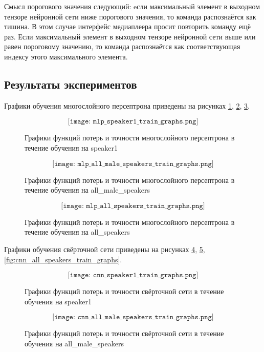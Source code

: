 Смысл порогового значения следующий: eсли максимальный элемент в выходном тензоре нейронной сети ниже порогового значения, то команда распознаётся как тишина. В этом случае интерфейс медиаплеера просит повторить команду ещё раз. Если максимальный элемент в выходном тензоре нейронной сети выше или равен пороговому значению, то команда распознаётся как соответствующая индексу этого максимального элемента. 

\newpage
\subsection{Результаты экспериментов}
Графики обучения многослойного персептрона приведены на рисунках \ref{fig:mlp_speaker1_train_graphs}, \ref{fig:mlp_all_male_speakers_train_graphs}, \ref{fig:mlp_all_speakers_train_graphs}.

\begin{figure}[H]
	\[\texttt{[image: mlp\_speaker1\_train\_graphs.png]}\]
	\caption{Графики функций потерь и точности многослойного персептрона в течение обучения на speaker1}
	\label{fig:mlp_speaker1_train_graphs}
\end{figure}

\begin{figure}[H]
	\[\texttt{[image: mlp\_all\_male\_speakers\_train\_graphs.png]}\]
	\caption{Графики функций потерь и точности многослойного персептрона в течение обучения на all\_male\_speakers}
	\label{fig:mlp_all_male_speakers_train_graphs}
\end{figure}

\begin{figure}[H]
	\[\texttt{[image: mlp\_all\_speakers\_train\_graphs.png]}\]
	\caption{Графики функций потерь и точности многослойного персептрона в течение обучения на all\_speakers}
	\label{fig:mlp_all_speakers_train_graphs}
\end{figure}


Графики обучения свёрточной сети приведены на рисунках \ref{fig:cnn_speaker1_train_graphs}, \ref{fig:cnn_all_male_speakers_train_graphs}, \ref{fig:cnn_all_speakers_train_graphs}.

\begin{figure}[H]
	\[\texttt{[image: cnn\_speaker1\_train\_graphs.png]}\]
	\caption{Графики функций потерь и точности свёрточной сети в течение обучения на speaker1}
	\label{fig:cnn_speaker1_train_graphs}
\end{figure}

\begin{figure}[H]
	\[\texttt{[image: cnn\_all\_male\_speakers\_train\_graphs.png]}\]
	\caption{Графики функций потерь и точности свёрточной сети в течение обучения на all\_male\_speakers}
	\label{fig:cnn_all_male_speakers_train_graphs}
\end{figure}

